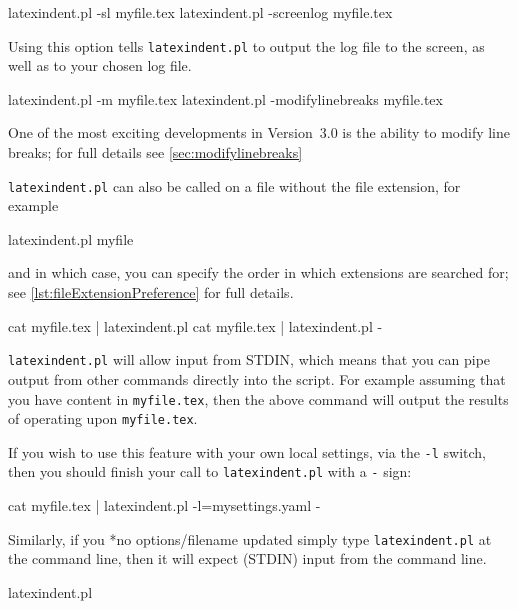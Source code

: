 	\begin{commandshell}
latexindent.pl -sl myfile.tex
latexindent.pl -screenlog myfile.tex
\end{commandshell}
	Using this%
	 option tells
	\texttt{latexindent.pl} to output the log file to the screen, as well as to your chosen
	log file.

	\begin{commandshell}
latexindent.pl -m myfile.tex
latexindent.pl -modifylinebreaks myfile.tex
\end{commandshell}

	One of the most exciting developments in Version~3.0 is the ability to modify line
	breaks; for full details see \vref{sec:modifylinebreaks}

	\texttt{latexindent.pl} can also be called on a file without the file extension, for
	example
	\begin{commandshell}
latexindent.pl myfile
\end{commandshell}
	and in which case, you can specify the order in which extensions are searched for; see
	\vref{lst:fileExtensionPreference} for full details.
	\begin{commandshell}
cat myfile.tex | latexindent.pl
cat myfile.tex | latexindent.pl -
\end{commandshell}
	\texttt{latexindent.pl} will%
	 allow input from STDIN, which means that you can pipe output from
	other commands directly into the script. For example assuming that you have content in
	\texttt{myfile.tex}, then the above command will output the results of operating upon
	\texttt{myfile.tex}.

	If you wish to use this feature with your own local settings, via the
	\texttt{-l} switch, then you should finish your call to
	\texttt{latexindent.pl} with a \texttt{-} sign:
	\begin{commandshell}
cat myfile.tex | latexindent.pl -l=mysettings.yaml -
\end{commandshell}

	Similarly, if you%
	*{no options/filename updated} simply type
	\texttt{latexindent.pl} at the command line, then it will expect (STDIN) input from the
	command line.
	\begin{commandshell}
latexindent.pl
\end{commandshell}

